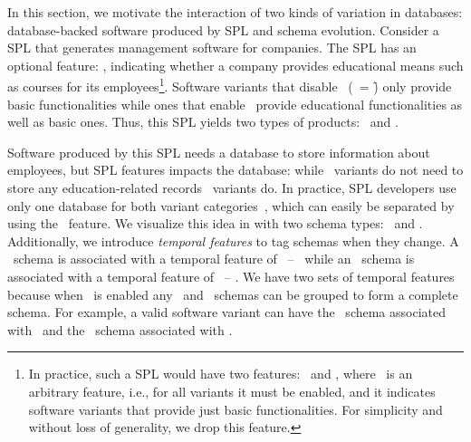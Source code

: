 In this section, we motivate the interaction of two kinds of variation in databases:
database-backed software produced by SPL and schema evolution.
Consider a SPL that generates management software for companies. 
The SPL has an optional feature: \edu, 
indicating whether a company
provides educational means such as courses for its 
employees\footnote{In practice, such a SPL would have two features: \base\ and \edu,
where \base\ is an arbitrary feature, i.e., for all variants it must be enabled, and it 
indicates software variants that provide just basic functionalities. For simplicity
and without loss of generality, we drop this feature.}. 
Software variants that disable \edu\ (\edu\ = \f) only provide basic 
functionalities while ones that enable \edu\ provide educational functionalities
as well as basic ones. Thus, this SPL yields two types of products:
\basic\ and \educational.

Software produced by this SPL needs a database to store information
about employees, but SPL features impacts the database:
while \basic\ variants do not need to store any education-related records 
\educational\ variants do. In practice, SPL developers use 
only one database for both variant categories~\cite{vdbSpl18ATW}, 
which can easily be separated
by using the \edu\ feature.
We visualize this idea in  with two
schema types: \basic\ and \educational.
Additionally, we introduce \emph{temporal features} to tag schemas when they change.
A \basic\ schema is associated with a temporal feature of \vOne\ -- \vFive\ while 
an \educational\ schema is associated with a temporal feature of \tOne\ -- \tFive.
We have two sets of temporal features because when \edu\ is enabled
any \educational\ and \basic\ schemas can be grouped to form a complete
schema.
For example, a valid software variant 
can have the \basic\ schema associated with \vThree\ and
the \educational\ schema associated with \tFour. 
%


